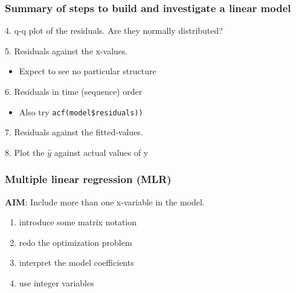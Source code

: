 \begin{frame}\frametitle{Summary of steps to build and investigate a linear model}
	
	4. q-q plot of the residuals. Are they normally distributed?
	
	5. Residuals against the x-values. 
	\begin{itemize}
		\item	Expect to see no particular structure 
	\end{itemize}
	
	6. Residuals in time (sequence) order 
	\begin{itemize}
		\item	Also try \texttt{acf(model\$residuals))} 
	\end{itemize}
	
	7. Residuals against the fitted-values.
	
	8. Plot the $\hat{y}$ against actual values of y
\end{frame}

\begin{frame}\frametitle{Multiple linear regression (MLR)}
	
	\textbf{AIM}: Include more than one x-variable in the model.
	\begin{enumerate}
		\item	introduce some matrix notation 
		\item	redo the optimization problem 
		\item	interpret the model coefficients 
		\item	use integer variables 
	\end{enumerate}
\end{frame}

